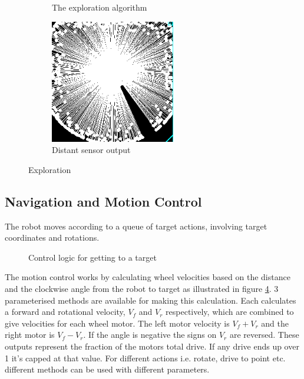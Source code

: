 \begin{figure}[H]
\begin{subfigure}[t]{0.5\textwidth}
    \centering
    
    \caption{The exploration algorithm}
    \label{fig:flow_target}
\end{subfigure}%
\begin{subfigure}[t]{0.5\textwidth}
    \centering
    \includegraphics[width=0.6\textwidth]{sensor_output.png}
    \caption{Distant sensor output \footnotemark}
    \label{fig:sd_output}
\end{subfigure}
\caption{Exploration}
\label{fig:exploration}
\end{figure}


\subsection{Navigation and Motion Control}
\label{subsec:motion}

The robot moves according to a queue of target actions, involving target coordinates and rotations.

\begin{figure}[H]
    \centering
    
    \caption{Control logic for getting to a target}
    \label{fig:flow_motion}
\end{figure}


The motion control works by calculating wheel velocities based on the distance and the clockwise angle from the robot to target as illustrated in figure \ref{fig:flow_motion}. 3 parameterised methods are available for making this calculation. Each calculates a forward and rotational velocity, $V_f$ and $V_r$ respectively, which are combined to give velocities for each wheel motor. The left motor velocity is $V_f + V_r$ and the right motor is $V_f - V_r$. If the angle is negative the signs on $V_r$ are reversed. These outputs represent the fraction of the motors total drive. If any drive ends up over 1 it's capped at that value. For different actions i.e. rotate, drive to point etc. different methods can be used with different parameters.

